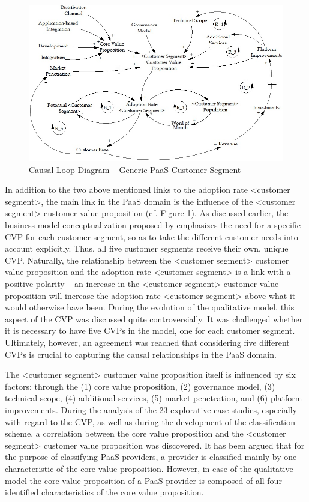 \begin{figure}[tb]
	\centering
	\includegraphics[width=\textwidth]{gfx/cld_customerSegment}
	\caption{Causal Loop Diagram -- Generic PaaS Customer Segment}
	\label{fig:cld_cs}
\end{figure}

In addition to the two above mentioned links to the adoption rate <customer segment>, the main link in the \ac{PaaS} domain is the influence of the <customer segment> customer value proposition (cf. Figure \ref{fig:cld_cs}). As discussed earlier, the business model conceptualization proposed by \citet{Johnson2008} emphasizes the need for a specific \ac{CVP} for each customer segment, so as to take the different customer needs into account explicitly. Thus, all five customer segments receive their own, unique \ac{CVP}. Naturally, the relationship between the <customer segment> customer value proposition and the adoption rate <customer segment> is a link with a positive polarity -- an increase in the <customer segment> customer value proposition will increase the adoption rate <customer segment> above what it would otherwise have been. During the evolution of the qualitative model, this aspect of the \ac{CVP} was discussed quite controversially. It was challenged whether it is necessary to have five \acp{CVP} in the model, one for each customer segment. Ultimately, however, an agreement was reached that considering five different \acp{CVP} is crucial to capturing the causal relationships in the \ac{PaaS} domain.

The <customer segment> customer value proposition itself is influenced by six factors: through the (1) core value proposition, (2) governance model, (3) technical scope, (4) additional services, (5) market penetration, and (6) platform improvements. During the analysis of the 23 explorative case studies, especially with regard to the \ac{CVP}, as well as during the development of the classification scheme, a correlation between the core value proposition and the <customer segment> customer value proposition was discovered. It has been argued that for the purpose of classifying \ac{PaaS} providers, a provider is classified mainly by one characteristic of the core value proposition. However, in case of the qualitative model the core value proposition of a \ac{PaaS} provider is composed of all four identified characteristics of the core value proposition.

